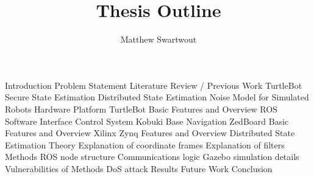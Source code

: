 \documentclass{article}
\begin{document}
\title{Thesis Outline}
\author{Matthew Swartwout}
\maketitle

\begin{outline}
\1 Introduction
    \2 Problem Statement
\1 Literature Review / Previous Work
    \2 TurtleBot
    \2 Secure State Estimation
    \2 Distributed State Estimation
    \2 Noise Model for Simulated Robots
\1 Hardware Platform
    \2 TurtleBot
        \3 Basic Features and Overview
        \3 ROS Software Interface
        \3 Control System
            \4 Kobuki Base
            \4 Navigation
    \2 ZedBoard
        \3 Basic Features and Overview
        \3 Xilinx Zynq Features and Overview
\1 Distributed State Estimation
    \2 Theory
        \3 Explanation of coordinate frames
        \3 Explanation of filters
    \2 Methods
        \3 ROS node structure
        \3 Communications logic
        \3 Gazebo simulation details
    \2 Vulnerabilities of Methods
        \3 DoS attack
\1 Results
\1 Future Work
\1 Conclusion
\end{outline}
\end{document}
